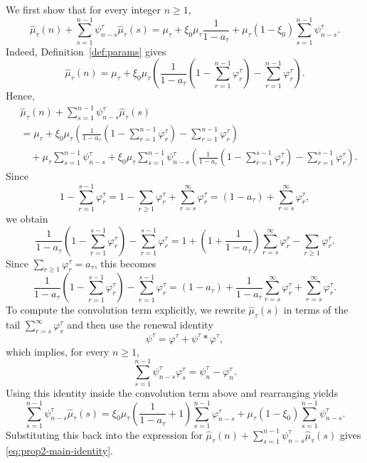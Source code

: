 \documentclass[letterpaper]{article}
\numberwithin{equation}{section}
\theoremstyle{definition}
\theoremstyle{remark}
\begin{document}
We first show that for every integer $n\ge1$,
\begin{equation}\label{eq:prop2-main-identity}
  \hat\mu_\tau(n)+\sum_{s=1}^{n-1}\psi_{n-s}^\tau\hat\mu_\tau(s)
  =
  \mu_\tau+\xi_0\mu_\tau\frac1{1-a_\tau}
  +\mu_\tau(1-\xi_0)\sum_{s=1}^{n-1}\psi_{n-s}^\tau.
\end{equation}
Indeed, Definition~\ref{def:params} gives
\[
  \hat\mu_\tau(n)
  =
  \mu_\tau
  +
  \xi_0\mu_\tau
  \left(
    \frac{1}{1-a_\tau}\left(1-\sum_{r=1}^{n-1}\varphi_r^\tau\right)
    -
    \sum_{r=1}^{n-1}\varphi_r^\tau
  \right).
\]
Hence,
\begin{align*}
&\hat\mu_\tau(n)+\sum_{s=1}^{n-1}\psi_{n-s}^\tau\hat\mu_\tau(s)
  \\
  &=
  \mu_\tau
  +
  \xi_0\mu_\tau
  \left(
    \frac{1}{1-a_\tau}\left(1-\sum_{r=1}^{n-1}\varphi_r^\tau\right)
    -
    \sum_{r=1}^{n-1}\varphi_r^\tau
  \right)
  \\
  &\quad
  +
  \mu_\tau\sum_{s=1}^{n-1}\psi_{n-s}^\tau
  +
  \xi_0\mu_\tau
  \sum_{s=1}^{n-1}\psi_{n-s}^\tau
  \left(
    \frac{1}{1-a_\tau}\left(1-\sum_{r=1}^{s-1}\varphi_r^\tau\right)
    -
    \sum_{r=1}^{s-1}\varphi_r^\tau
  \right).
\end{align*}
Since
\[
  1-\sum_{r=1}^{s-1}\varphi_r^\tau
  =1-\sum_{r\ge1}\varphi_r^\tau+\sum_{r=s}^{\infty}\varphi_r^\tau
  =(1-a_\tau)+\sum_{r=s}^{\infty}\varphi_r^\tau,
\]
we obtain
\[
  \frac{1}{1-a_\tau}\left(1-\sum_{r=1}^{s-1}\varphi_r^\tau\right)
  -\sum_{r=1}^{s-1}\varphi_r^\tau
  =
  1+\left(1+\frac{1}{1-a_\tau}\right)\sum_{r=s}^{\infty}\varphi_r^\tau
  -\sum_{r\ge1}\varphi_r^\tau.
\]
Since $\sum_{r\ge1}\varphi_r^\tau=a_\tau$, this becomes
\[
  \frac{1}{1-a_\tau}\left(1-\sum_{r=1}^{s-1}\varphi_r^\tau\right)
  -\sum_{r=1}^{s-1}\varphi_r^\tau
  =
  (1-a_\tau)+\frac{1}{1-a_\tau}\sum_{r=s}^{\infty}\varphi_r^\tau+\sum_{r=s}^{\infty}\varphi_r^\tau.
\]
To compute the convolution term explicitly, we rewrite $\hat\mu_\tau(s)$ in terms of the tail
$\sum_{r=s}^\infty \varphi_r^\tau$ and then use the renewal identity
\[
  \psi^\tau=\varphi^\tau+\psi^\tau*\varphi^\tau,
\]
which implies, for every $n\ge1$,
\[
  \sum_{s=1}^{n-1}\psi_{n-s}^\tau\varphi_s^\tau
  =
  \psi_n^\tau-\varphi_n^\tau.
\]
Using this identity inside the convolution term above and rearranging yields
\[
  \sum_{s=1}^{n-1}\psi_{n-s}^\tau\hat\mu_\tau(s)
  =
  \xi_0\mu_\tau\left(\frac1{1-a_\tau}+1\right)\sum_{s=1}^{n-1}\varphi_{n-s}^\tau
  +
  \mu_\tau(1-\xi_0)\sum_{s=1}^{n-1}\psi_{n-s}^\tau.
\]
Substituting this back into the expression for
$\hat\mu_\tau(n)+\sum_{s=1}^{n-1}\psi_{n-s}^\tau\hat\mu_\tau(s)$ gives
\eqref{eq:prop2-main-identity}.
\end{document}
